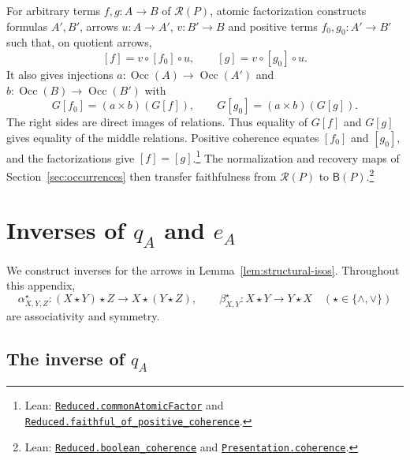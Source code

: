 \documentclass[11pt]{article}
\newcommand{\B}{\mathsf B}
\newcommand{\Occ}{\operatorname{Occ}}
\begin{document}
For arbitrary terms $f,g:A\to B$ of $\mathcal R(P)$, atomic
factorization constructs formulas $A',B'$, arrows
$u:A\to A'$, $v:B'\to B$ and positive terms
$f_0,g_0:A'\to B'$ such that, on quotient arrows,
\[
 [f]=v\circ[f_0]\circ u,\qquad [g]=v\circ[g_0]\circ u.
\]
It also gives injections
$a:\Occ(A)\to\Occ(A')$ and $b:\Occ(B)\to\Occ(B')$ with
\[
 G[f_0]=(a\times b)(G[f]),\qquad
 G[g_0]=(a\times b)(G[g]).
\]
The right sides are direct images of relations. Thus equality
of $G[f]$ and $G[g]$ gives equality of the middle relations.
Positive coherence equates $[f_0]$ and $[g_0]$, and the
factorizations give $[f]=[g]$.\footnote{\raggedright Lean:
\href{https://github.com/flengyel/Dosen-Petric-Maximality/blob/5dbee39bea09539bd130f729e82636419f71f920/DosenPetric/CommonAtomicFactorization.lean\#L51}{\texttt{Reduced.\allowbreak{}commonAtomicFactor}} and
\href{https://github.com/flengyel/Dosen-Petric-Maximality/blob/5dbee39bea09539bd130f729e82636419f71f920/DosenPetric/CommonAtomicFactorization.lean\#L123}{\texttt{Reduced.\allowbreak{}faithful\_of\_positive\_coherence}}.}
The normalization and recovery maps of Section~\ref{sec:occurrences}
then transfer faithfulness from $\mathcal R(P)$ to $\B(P)$.\footnote{\raggedright Lean:
\href{https://github.com/flengyel/Dosen-Petric-Maximality/blob/5dbee39bea09539bd130f729e82636419f71f920/DosenPetric/ReducedCoherence.lean\#L17}{\texttt{Reduced.\allowbreak{}boolean\_coherence}} and
\href{https://github.com/flengyel/Dosen-Petric-Maximality/blob/5dbee39bea09539bd130f729e82636419f71f920/DosenPetric/PresentationCoherence.lean\#L13}{\texttt{Presentation.\allowbreak{}coherence}}.}

\section{Inverses of \texorpdfstring{$q_A$ and $e_A$}{qA and eA}}
\label{app:explicit-inverses}

We construct inverses for the arrows in
Lemma~\ref{lem:structural-isos}. Throughout this appendix,
\[
 \alpha^\star_{X,Y,Z}:(X\star Y)\star Z\longrightarrow
          X\star(Y\star Z),\qquad
 \beta^\star_{X,Y}:X\star Y\longrightarrow Y\star X
 \quad(\star\in\{\wedge,\vee\})
\]
are associativity and symmetry.

\subsection{The inverse of \texorpdfstring{$q_A$}{qA}}
\end{document}
